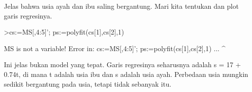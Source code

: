 \documentclass[12pt,arial,letterpaper]{book}
\begin{document}
\begin{eulercomment}
\begin{eulercomment}
\begin{eulercomment}
\begin{eulercomment}
\begin{eulercomment}
\begin{eulercomment}
\begin{eulercomment}
\begin{eulercomment}
\begin{eulercomment}
\begin{eulercomment}
\begin{eulercomment}
\begin{eulercomment}
\begin{eulercomment}
\begin{eulercomment}
\begin{eulercomment}
\begin{eulercomment}
\begin{eulercomment}
\begin{eulercomment}
\begin{eulercomment}
\begin{eulercomment}
\begin{eulercomment}
\begin{eulercomment}
\begin{eulercomment}
\begin{eulercomment}
\begin{eulercomment}
\begin{eulercomment}
\begin{eulercomment}
\begin{eulercomment}
\begin{eulercomment}
\begin{eulercomment}
\begin{eulercomment}
\begin{eulercomment}
\begin{eulercomment}
Jelas bahwa usia ayah dan ibu saling bergantung. Mari kita tentukan
dan plot garis regresinya.
\end{eulercomment}
\begin{eulerprompt}
>cs:=MS[,4:5]'; ps:=polyfit(cs[1],cs[2],1)
\end{eulerprompt}
\begin{euleroutput}
  MS is not a variable!
  Error in:
  cs:=MS[,4:5]'; ps:=polyfit(cs[1],cs[2],1) ...
              ^
\end{euleroutput}
\begin{eulercomment}
Ini jelas bukan model yang tepat. Garis regresinya seharusnya adalah s
= 17 + 0.74t, di mana t adalah usia ibu dan s adalah usia ayah.
Perbedaan usia mungkin sedikit bergantung pada usia, tetapi tidak
sebanyak itu.


\end{eulercomment}
\end{eulercomment}
\end{eulercomment}
\end{eulercomment}
\end{eulercomment}
\end{eulercomment}
\end{eulercomment}
\end{eulercomment}
\end{eulercomment}
\end{eulercomment}
\end{eulercomment}
\end{eulercomment}
\end{eulercomment}
\end{eulercomment}
\end{eulercomment}
\end{eulercomment}
\end{eulercomment}
\end{eulercomment}
\end{eulercomment}
\end{eulercomment}
\end{eulercomment}
\end{eulercomment}
\end{eulercomment}
\end{eulercomment}
\end{eulercomment}
\end{eulercomment}
\end{eulercomment}
\end{eulercomment}
\end{eulercomment}
\end{eulercomment}
\end{eulercomment}
\end{eulercomment}
\end{eulercomment}
\end{document}
